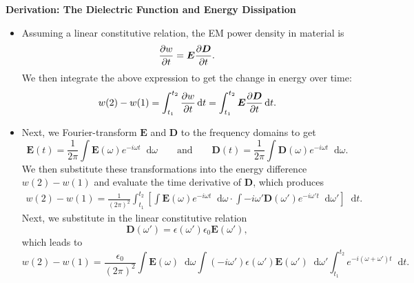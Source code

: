 \documentclass[11pt, a4paper]{article}
\newcommand{\diff}{\mathop{}\!\mathrm{d}} %
\renewcommand{\vec}[1]{\bm{#1}} %
\newcommand{\E}{\vec{E}} %
\newcommand{\D}{\vec{D}}  %
\newcommand{\ee}{\epsilon_{0}}  %
\begin{document}
\textbf{Derivation: The Dielectric Function and Energy Dissipation}
\begin{itemize}


    \item Assuming a linear constitutive relation, the EM power density in material is
    \begin{equation*}
        \pdv{w}{t} = \E \pdv{\D}{t}.
    \end{equation*}
    We then integrate the above expression to get the change in energy over time:
    \begin{equation*}
        w(2) - w(1) = \int_{t_{1}}^{t_{2}} \pdv{w}{t}\diff t = \int_{t_{1}}^{t_{2}} \E \pdv{\D}{t} \diff t.
    \end{equation*}
    
    \item Next, we Fourier-transform $ \E $ and $ \D $ to the frequency domains to get
    \begin{equation*}
        \E(t) = \frac{1}{2\pi} \int \E(\omega) e^{-i\omega t} \diff \omega \qquad \text{and} \qquad \D(t) = \frac{1}{2\pi} \int \D(\omega) e^{-i\omega t} \diff \omega.
    \end{equation*}
    We then substitute these transformations into the energy difference $ w(2) - w(1) $ and evaluate the time derivative of $ \D $, which produces
    \begin{align*}
        w(2) - w(1) = \frac{1}{(2\pi)^{2}}\int_{t_{1}}^{t_{2}} \left[ \int \E(\omega)e^{-i\omega t} \diff \omega \cdot \int -i \omega' \D(\omega')e^{-i\omega't} \diff \omega' \right] \diff t.
    \end{align*}
    Next, we substitute in the linear constitutive relation
    \begin{equation*}
        \D(\omega') = \epsilon(\omega')\ee \E(\omega'),
    \end{equation*}
    which leads to
    \begin{equation*}
        w(2) - w(1) = \frac{\ee}{(2\pi)^{2}} \int \E(\omega) \diff \omega \int  (-i\omega')\epsilon(\omega')\E(\omega') \diff \omega' \int_{t_{1}}^{t_{2}} e^{-i(\omega + \omega')t} \diff t.
    \end{equation*}
    

\end{itemize}
\end{document}
